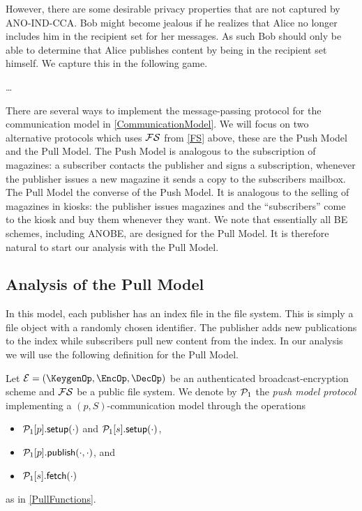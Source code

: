 However, there are some desirable privacy properties that are not captured by 
ANO-IND-CCA\@.
Bob might become jealous if he realizes that Alice no longer includes him in 
the recipient set for her messages.
As such Bob should only be able to determine that Alice publishes content by 
being in the recipient set himself.
We capture this in the following game.

\begin{definition}\label{JealousBob}
  \dots
\end{definition}

There are several ways to implement the message-passing protocol for the 
communication model in \cref{CommunicationModel}.
We will focus on two alternative protocols which uses \(\FS\) from \cref{FS} 
above, these are the Push Model and the Pull Model.
The Push Model is analogous to the subscription of magazines:
a subscriber contacts the publisher and signs a subscription, whenever the 
publisher issues a new magazine it sends a copy to the subscribers mailbox.
The Pull Model the converse of the Push Model.
It is analogous to the selling of magazines in kiosks:
the publisher issues magazines and the \enquote{subscribers} come to the kiosk 
and buy them whenever they want.
We note that essentially all \ac{BE} schemes, including \ac{ANOBE}, are 
designed for the Pull Model.
It is therefore natural to start our analysis with the Pull Model.

\subsection{Analysis of the Pull Model}
\label{PullAnalysis}

In this model, each publisher has an index file in the file system.
This is simply a file object with a randomly chosen identifier.
The publisher adds new publications to the index while subscribers pull new 
content from the index.
In our analysis we will use the following definition for the Pull Model.

\begin{definition}\label{PullModel}
  Let \(\mathcal{E} = (\KeygenOp, \EncOp, \DecOp)\) be an authenticated 
  broadcast-encryption scheme and \(\FS\) be a public file system.
  We denote by \(\operatorname{\mathcal{P}_1}\) the \emph{push model protocol} implementing a \((p, 
    S)\)-communication model through the operations
  \begin{itemize}
    \item \(\psetup{p}[\cdot]\) and \(\psetup{s}[\cdot]\),
    \item \(\ppub{p}[\cdot][\cdot]\), and
    \item \(\pget{s}[\cdot]\)
  \end{itemize}
  as in \cref{PullFunctions}.
\end{definition}

